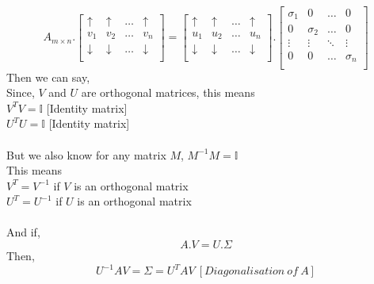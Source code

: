 \documentclass{article}
\begin{document}
$$
  A_{m \times n}.\begin{bmatrix}
    \uparrow   & \uparrow   & \dots & \uparrow   \\
    v_1        & v_2        & \dots & v_n        \\
    \downarrow & \downarrow & \dots & \downarrow \\
  \end{bmatrix}=\begin{bmatrix}
    \uparrow   & \uparrow   & \dots & \uparrow   \\
    u_1        & u_2        & \dots & u_n        \\
    \downarrow & \downarrow & \dots & \downarrow \\
  \end{bmatrix}.\begin{bmatrix}
    \sigma_1 & 0        & \dots  & 0        \\
    0        & \sigma_2 & \dots  & 0        \\
    \vdots   & \vdots   & \ddots & \vdots   \\
    0        & 0        & \dots  & \sigma_n \\
  \end{bmatrix}
$$
Then we can say,\\
Since, $V$ and $U$ are orthogonal matrices, this means\\
$V^TV=\mathbb{I}$ [Identity matrix]\\
$U^TU=\mathbb{I}$ [Identity matrix]\\\\
But we also know for any matrix $M$, $M^{-1}M=\mathbb{I}$\\
This means\\
$V^{T}=V^{-1}$ if $V$ is an orthogonal matrix\\
$U^{T}=U^{-1}$ if $U$ is an orthogonal matrix\\\\
And if,
$$
  A.V=U.\Sigma
$$
Then,
$$
  U^{-1}AV=\Sigma=U^{T}AV \ [Diagonalisation\ of\ A]
$$
\end{document}
